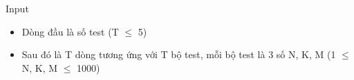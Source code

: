 Input
\begin{itemize}
	\item     Dòng đầu là số test (T  $\le$  5)   
	\item     Sau đó là T dòng tương ứng với T bộ test, mỗi bộ test là 3 số N, K, M (1  $\le$  N, K, M  $\le$  1000)   
\end{itemize}